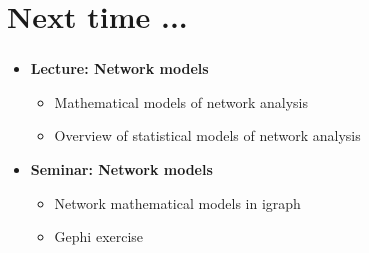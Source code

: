 \documentclass[8pt]{beamer}
\begin{document}




\section*{Next time ...}

\bgroup
{}
\begin{frame}[plain]{}
\begin{center}
\color{white}{\Huge\insertsection}
\end{center}
\end{frame}
\egroup


\begin{frame}
\frametitle{\insertsection}

\begin{itemize}

\item 	\textbf{Lecture: Network models}
	\begin{itemize}
	\item Mathematical models of network analysis
	\item Overview of statistical models of network analysis
	\end{itemize}	


\medskip
\medskip


\item 	\textbf{Seminar: Network models}
	\begin{itemize}
	\item Network mathematical models in igraph
	\item Gephi exercise
	\end{itemize}
	
\end{itemize}

\end{frame}

\end{document}

